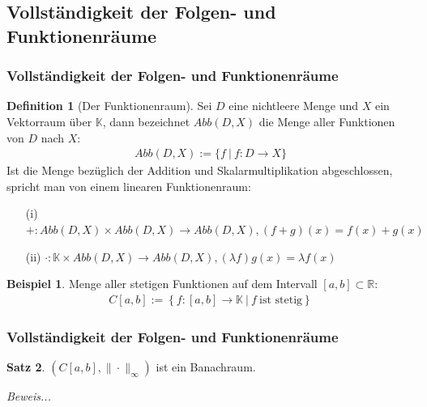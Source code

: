 \documentclass[t, handout]{beamer}
\newcommand{\R}{\mathbb{R}}
\newcommand{\K}{\mathbb{K}}
\theoremstyle{definition} %
\newtheorem{sa}{Satz}[section] %
\newtheorem{dfi}[sa]{Definition} %
\newtheorem*{bsp}{Beispiel}
\begin{document}
\subsection{Vollständigkeit der Folgen- und Funktionenräume}

\begin{frame}
\frametitle{Vollständigkeit der Folgen- und Funktionenräume}
\begin{dfi}[Der Funktionenraum]
Sei $D$ eine nichtleere Menge und $X$ ein Vektorraum über $\K$, dann bezeichnet $Abb(D,X)$ die Menge aller Funktionen von $D$ nach $X$:
\begin{align*}
Abb(D,X) := \{f \: | \: f : D \rightarrow X\}
\end{align*}
Ist die Menge bezüglich der Addition und Skalarmultiplikation abgeschlossen, spricht man von einem linearen Funktionenraum:
\begin{itemize}
\item[(i)]  $+ : Abb(D,X) \times Abb(D,X) \rightarrow Abb(D,X), (f + g)(x) = f(x) + g(x)$\\
\item[(ii)]  $\cdot :  \K \times Abb(D,X) \rightarrow Abb(D,X), (\lambda f)g(x) = \lambda f(x)$\\
\end{itemize}
\end{dfi}
\pause
\begin{bsp}
Menge aller stetigen Funktionen auf dem Intervall $[a,b] \subset \R$:
\begin{align*}
C[a,b] := \left\{ f : [a,b] \rightarrow \K \: | \: f \: \text{ist stetig} \right\}
\end{align*}
\end{bsp}
\end{frame}

\begin{frame}
\frametitle{Vollständigkeit der Folgen- und Funktionenräume}
\begin{sa}
$(C[a,b], \|\cdot\|_\infty)$ ist ein Banachraum.
\end{sa}
\textit{Beweis...}
\end{frame}
\end{document}

